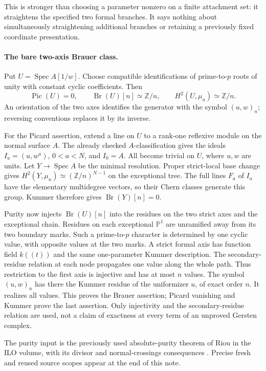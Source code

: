 This is stronger than choosing a parameter nonzero on a finite
attachment set: it straightens the specified two formal branches.
It says nothing about simultaneously straightening additional branches
or retaining a previously fixed coordinate presentation.

\paragraph{The bare two-axis Brauer class.}
Put $U=\operatorname{Spec}A[1/w]$.  Choose compatible identifications
of prime-to-$p$ roots of unity with constant cyclic coefficients.
Then
\[
       \operatorname{Pic}(U)=0,\qquad
       \operatorname{Br}(U)[n]\simeq\mathbb Z/n,
       \qquad H^2(U,\mu_n)\simeq\mathbb Z/n.          \tag{C.TP.4}
\]
An orientation of the two axes identifies the generator with the
symbol $(u,w)_n$; reversing conventions replaces it by its inverse.

For the Picard assertion, extend a line on $U$ to a rank-one
reflexive module on the normal surface $A$.  The already checked
$A$-classification gives the ideals $I_a=(u,w^a)$, $0<a<N$, and
$I_0=A$.  All become trivial on $U$, where $u,w$ are units.
Let $Y\to\operatorname{Spec}A$ be the minimal resolution.
Proper strict-local base change gives
$H^2(Y,\mu_n)\simeq (\mathbb Z/n)^{N-1}$ on the exceptional
tree.  The full lines $F_a$ of $I_a$ have the elementary
multidegree vectors, so their Chern classes generate this group.
Kummer therefore gives $\operatorname{Br}(Y)[n]=0$.

Purity now injects $\operatorname{Br}(U)[n]$ into the residues
on the two strict axes and the exceptional chain.  Residues on each
exceptional $\mathbb P^1$ are unramified away from its two boundary
marks.  Such a prime-to-$p$ character is determined by one cyclic
value, with opposite values at the two marks.  A strict formal axis
has function field $k((t))$ and the same one-parameter Kummer
description.  The secondary-residue relation at each node propagates
one value along the whole path.  Thus restriction to the first axis
is injective and has at most $n$ values.  The symbol $(u,w)_n$ has
there the Kummer residue of the uniformizer $u$, of exact order $n$.
It realizes all values.  This proves the Brauer assertion; Picard
vanishing and Kummer prove the last assertion.  Only injectivity and
the secondary-residue relation are used, not a claim of exactness
at every term of an unproved Gersten complex.

The purity input is the previously used absolute-purity theorem of
Riou in the ILO volume, with its divisor and normal-crossings
consequences \cite[Exp.~XVI, \S3.1]{A_ILO2014}.  Precise fresh and
reused source scopes appear at the end of this note.

